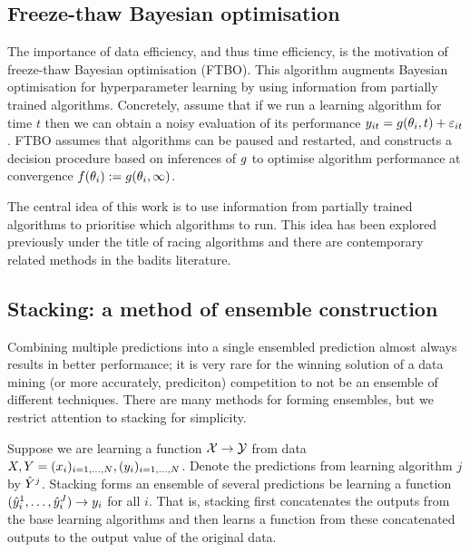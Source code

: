 \documentclass{article} %
\begin{document}

\subsection{Freeze-thaw Bayesian optimisation}

The importance of data efficiency, and thus time efficiency, is the motivation of freeze-thaw Bayesian optimisation (FTBO).
This algorithm augments Bayesian optimisation for hyperparameter learning by using information from partially trained algorithms.
Concretely, assume that if we run a learning algorithm for time $t$ then we can obtain a noisy evaluation of its performance ${y_{it} = g(\theta_i, t) + \varepsilon_{it}}$.
FTBO assumes that algorithms can be paused and restarted, and constructs a decision procedure based on inferences of $g$ to optimise algorithm performance at convergence \ie ${f(\theta_i) := g(\theta_i, \infty)}$.

The central idea of this work is to use information from partially trained algorithms to prioritise which algorithms to run.
This idea has been explored previously under the title of racing algorithms and there are contemporary related methods in the badits literature.

\subsection{Stacking: a method of ensemble construction}

Combining multiple predictions into a single ensembled prediction almost always results in better performance; it is very rare for the winning solution of a data mining (or more accurately, prediciton) competition to not be an ensemble of different techniques.
There are many methods for forming ensembles, but we restrict attention to stacking for simplicity.

Suppose we are learning a function ${\mathcal{X} \to \mathcal{Y}}$ from data ${X, Y = (x_i)_{i=1,\dots,N}, (y_i)_{i=1,\dots,N}}$.
Denote the predictions\footnotemark{} from learning algorithm $j$ by $\hat{Y}^j$.
Stacking forms an ensemble of several predictions be learning a function ${(\hat{y}_i^1,\dots,\hat{y}_i^J) \to y_i}$ for all $i$.
That is, stacking first concatenates the outputs from the base learning algorithms and then learns a function from these concatenated outputs to the output value of the original data.
\end{document}
